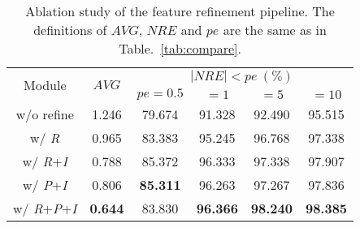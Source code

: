 \documentclass[journal]{vgtc}
\begin{document}
\begin{table}[!htb]
	\centering
		\begin{tabular}{cccccc}
			\toprule[2pt]
			\multicolumn{1}{c}{\multirow{2}{*}{Module}} & \multicolumn{1}{c}{\multirow{2}{*}{$AVG$}} & \multicolumn{4}{c}{$ |NRE|<pe~(\%) $}                                                                             \\ \cline{3-6} 
			\multicolumn{1}{c}{}                        & \multicolumn{1}{c}{}                         & \multicolumn{1}{c}{$pe=0.5$} & \multicolumn{1}{c}{$=1$} & $=5$ & $=10$ \\
			\midrule
			w/o refine                                       &     1.246		&		79.674		&		91.328		&		92.490		&		95.515               \\
			w/ \textit{R}                                        &   0.965		&		83.383		&		95.245		&		96.768		&		97.338               \\
			w/ \textit{R}+\textit{I}                                        &   0.788		&		85.372		&		96.333		&		97.338		&		97.907               \\
			w/ \textit{P}+\textit{I}                                        &    0.806		&		\textbf{85.311}		&		96.263		&		97.267		&		97.836               \\
			w/ \textit{R}+\textit{P}+\textit{I}                                        &    \textbf{0.644}		&		83.830		&		\textbf{96.366}		&		\textbf{98.240}		&		\textbf{98.385}              \\
			\bottomrule[2pt]
		\end{tabular}
	\caption{Ablation study of the feature refinement pipeline. The definitions of $AVG$, $NRE$ and $pe$ are the same as in Table.~\ref{tab:compare}.}
	\label{tab:abalation_study}
\end{table}
\end{document}
